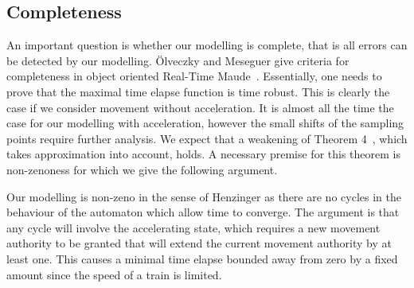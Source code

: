 \subsection{Completeness}
An important question is whether our modelling is complete, that is
all errors can be detected by our
modelling. \"Olveczky and Meseguer give criteria for
completeness in object oriented Real-Time Maude~\cite{PO06}. Essentially, one
needs to prove that the maximal time elapse function is time
robust. This is clearly the case if we consider movement without
acceleration. It is almost all the time the case for our modelling
with acceleration, however the small shifts of the sampling points
require further analysis. We expect that a weakening of Theorem 4~\cite{PO06}, which takes approximation into account, holds.  A
necessary premise for this theorem is non-zenoness for which we give
the following argument.

Our modelling is non-zeno in the sense of Henzinger \cite{Henzinger2000} as
there are no cycles in the behaviour of the automaton which allow time
to converge.  The argument is that any cycle will involve the
accelerating state, which requires a new movement authority to be
granted that will extend the current movement authority by at least
one. This causes a minimal time elapse bounded away from zero by a
fixed amount since the speed of a train is limited.


